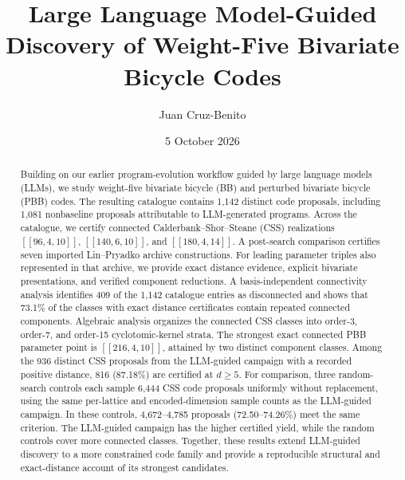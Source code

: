 \documentclass[aps,prx,twocolumn,superscriptaddress,nofootinbib,floatfix]{revtex4-2}
\newcommand{\code}[1]{\ensuremath{\left[\!\left[#1\right]\!\right]}}
\begin{document}
\title{Large Language Model-Guided Discovery of Weight-Five Bivariate
Bicycle Codes}

\author{Juan Cruz-Benito}

\date{5 October 2026}

\begin{abstract}
Building on our earlier program-evolution workflow guided by large language
models (LLMs), we study weight-five bivariate bicycle (BB) and perturbed
bivariate bicycle (PBB) codes.  The resulting catalogue contains 1,142 distinct
code proposals, including 1,081 nonbaseline proposals attributable to
LLM-generated programs.  Across the catalogue, we certify connected
Calderbank--Shor--Steane (CSS) realizations
$\code{96,4,10}$, $\code{140,6,10}$, and $\code{180,4,14}$.
A post-search comparison certifies seven imported
Lin--Pryadko archive constructions.  For leading parameter triples also
represented in that archive, we provide exact distance evidence, explicit
bivariate presentations, and verified component reductions.  A
basis-independent connectivity analysis identifies 409 of the 1,142 catalogue
entries as disconnected and shows that 73.1\% of the classes with exact
distance certificates contain repeated connected components.
Algebraic analysis organizes the connected CSS classes into order-3,
order-7, and order-15 cyclotomic-kernel strata.  The strongest exact
connected PBB parameter point is $\code{216,4,10}$, attained
by two distinct component classes.  Among the 936 distinct CSS proposals from
the LLM-guided campaign with a recorded positive distance, 816 (87.18\%) are
certified at $d\geq5$.  For comparison, three random-search controls each
sample 6,444 CSS code proposals uniformly without replacement, using the same
per-lattice and encoded-dimension sample counts as the LLM-guided campaign.
In these controls, 4,672--4,785 proposals (72.50--74.26\%) meet the same
criterion.  The LLM-guided campaign has the higher certified yield, while the
random controls cover more connected classes.  Together, these results extend
LLM-guided discovery to a more
constrained code family and provide a reproducible structural and
exact-distance account of its strongest candidates.
\end{abstract}

\maketitle
\end{document}

